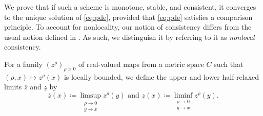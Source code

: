 \documentclass[12pt]{article}
\begin{document}
We prove that if such a scheme is monotone, stable, and consistent,
it converges to the unique solution of \eqref{eq:pde}, provided that
\eqref{eq:pde} satisfies a comparison principle. To account for nonlocality,
our notion of consistency differs from the usual notion defined in
\cite[Eq. (2.4)]{MR1115933}. As such, we distinguish it by referring
to it as \emph{nonlocal} consistency.

For a family $(z^{\rho})_{\rho>0}$ of real-valued maps from a metric
space $C$ such that $(\rho,x)\mapsto z^{\rho}(x)$ is locally bounded,
we define the upper and lower half-relaxed limits $\overline{z}$
and $\underline{z}$ by
\[
\overline{z}(x)\coloneqq\limsup_{\substack{\rho\rightarrow0\\
y\rightarrow x
}
}z^{\rho}(y)\text{ and }\underline{z}(x)\coloneqq\liminf_{\substack{\rho\rightarrow0\\
y\rightarrow x
}
}z^{\rho}(y).
\]
\end{document}
